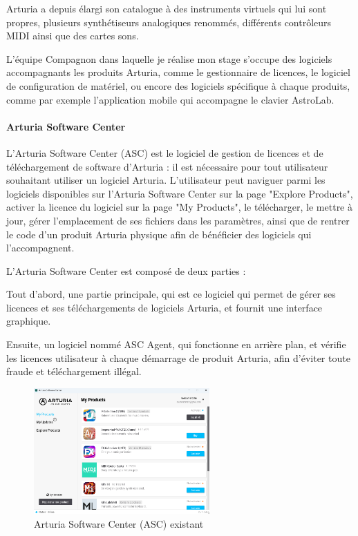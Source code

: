 \documentclass[francais]{rapportPFE}  %
\begin{document}
Arturia a depuis élargi son catalogue à des instruments virtuels qui lui sont propres, plusieurs synthétiseurs analogiques renommés, différents contrôleurs MIDI ainsi que des cartes sons. 

L’équipe Compagnon dans laquelle je réalise mon stage s’occupe des logiciels accompagnants les produits Arturia, comme le gestionnaire de licences, le logiciel de configuration de matériel, ou encore des logiciels spécifique à chaque produits, comme par exemple l'application mobile qui accompagne le clavier AstroLab. 

\paragraph{Arturia Software Center}
L’Arturia Software Center (ASC) est le logiciel de gestion de licences et de
téléchargement de software d’Arturia : il est nécessaire pour tout utilisateur
souhaitant utiliser un logiciel Arturia. L'utilisateur peut naviguer parmi les logiciels disponibles sur l'Arturia Software Center sur la page "Explore Products", activer la licence du logiciel sur la page "My Products", le télécharger, le mettre à jour, gérer l'emplacement de ses fichiers dans les paramètres, ainsi que de rentrer le code d'un produit Arturia physique afin de bénéficier des logiciels qui l'accompagnent.

L’Arturia Software Center est composé de deux parties : 

Tout d'abord, une partie principale, qui est ce logiciel qui permet de gérer ses licences et ses téléchargements de logiciels Arturia, et fournit une interface graphique.

Ensuite, un logiciel nommé ASC Agent, qui fonctionne en arrière plan, et vérifie les licences utilisateur à chaque démarrage de produit Arturia, afin d'éviter toute fraude et téléchargement illégal.

\begin{figure}[!t]
	\centering
	\includegraphics[width=0.6\textwidth]{graphics/asc_existant.png}
	\begin{tiny}
	\end{tiny}
	\caption{Arturia Software Center (ASC) existant}
	\label{fig:Expe}
\end{figure}
\end{document}
